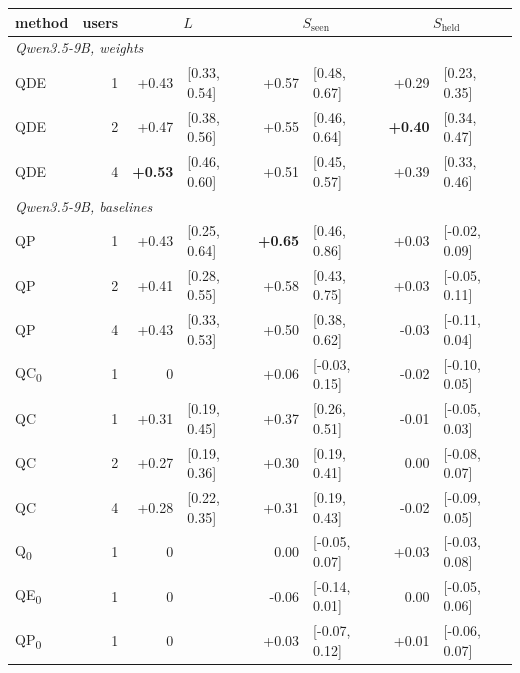 \begin{tabular}{lrr@{\hspace{0.4em}}lr@{\hspace{0.4em}}lr@{\hspace{0.4em}}l}
\toprule
method & users & \multicolumn{2}{c}{$L$} & \multicolumn{2}{c}{$S_{\mathrm{seen}}$} & \multicolumn{2}{c}{$S_{\mathrm{held}}$} \\
\midrule
\multicolumn{8}{l}{\emph{Qwen3.5-9B, weights}} \\
QDE & 1 & +0.43 & {\scriptsize [0.33, 0.54]} & +0.57 & {\scriptsize [0.48, 0.67]} & +0.29 & {\scriptsize [0.23, 0.35]} \\
QDE & 2 & +0.47 & {\scriptsize [0.38, 0.56]} & +0.55 & {\scriptsize [0.46, 0.64]} & \textbf{+0.40} & {\scriptsize [0.34, 0.47]} \\
QDE & 4 & \textbf{+0.53} & {\scriptsize [0.46, 0.60]} & +0.51 & {\scriptsize [0.45, 0.57]} & +0.39 & {\scriptsize [0.33, 0.46]} \\
\midrule
\multicolumn{8}{l}{\emph{Qwen3.5-9B, baselines}} \\
QP & 1 & +0.43 & {\scriptsize [0.25, 0.64]} & \textbf{+0.65} & {\scriptsize [0.46, 0.86]} & +0.03 & {\scriptsize [-0.02, 0.09]} \\
QP & 2 & +0.41 & {\scriptsize [0.28, 0.55]} & +0.58 & {\scriptsize [0.43, 0.75]} & +0.03 & {\scriptsize [-0.05, 0.11]} \\
QP & 4 & +0.43 & {\scriptsize [0.33, 0.53]} & +0.50 & {\scriptsize [0.38, 0.62]} & -0.03 & {\scriptsize [-0.11, 0.04]} \\
QC\textsubscript{0} & 1 & 0 & & +0.06 & {\scriptsize [-0.03, 0.15]} & -0.02 & {\scriptsize [-0.10, 0.05]} \\
QC & 1 & +0.31 & {\scriptsize [0.19, 0.45]} & +0.37 & {\scriptsize [0.26, 0.51]} & -0.01 & {\scriptsize [-0.05, 0.03]} \\
QC & 2 & +0.27 & {\scriptsize [0.19, 0.36]} & +0.30 & {\scriptsize [0.19, 0.41]} & 0.00 & {\scriptsize [-0.08, 0.07]} \\
QC & 4 & +0.28 & {\scriptsize [0.22, 0.35]} & +0.31 & {\scriptsize [0.19, 0.43]} & -0.02 & {\scriptsize [-0.09, 0.05]} \\
Q\textsubscript{0} & 1 & 0 & & 0.00 & {\scriptsize [-0.05, 0.07]} & +0.03 & {\scriptsize [-0.03, 0.08]} \\
QE\textsubscript{0} & 1 & 0 & & -0.06 & {\scriptsize [-0.14, 0.01]} & 0.00 & {\scriptsize [-0.05, 0.06]} \\
QP\textsubscript{0} & 1 & 0 & & +0.03 & {\scriptsize [-0.07, 0.12]} & +0.01 & {\scriptsize [-0.06, 0.07]} \\
\bottomrule
\end{tabular}
